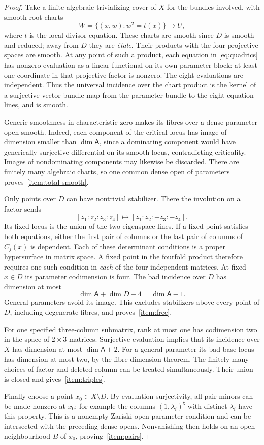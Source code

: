 \begin{proof}
Take a finite algebraic trivializing cover of $X$ for the bundles involved, with smooth root charts
\[
 W=\{(x,w):w^2=t(x)\}\longrightarrow U,
\]
where $t$ is the local divisor equation. These charts are smooth since $D$ is smooth and reduced; away from $D$ they are \emph{\'{e}tale}. Their products with the four projective spaces are smooth. At any point of such a product, each equation in \eqref{eq:quadrics} has nonzero evaluation as a linear functional on its own parameter block: at least one coordinate in that projective factor is nonzero. The eight evaluations are independent. Thus the universal incidence over the chart product is the kernel of a surjective vector-bundle map from the parameter bundle to the eight equation lines, and is smooth.

Generic smoothness in characteristic zero makes its fibres over a dense parameter open smooth. Indeed, each component of the critical locus has image of dimension smaller than $\dim\mathsf A$, since a dominating component would have generically surjective differential on its smooth locus, contradicting criticality. Images of nondominating components may likewise be discarded. There are finitely many algebraic charts, so one common dense open of parameters proves~\ref{item:total-smooth}.

Only points over $D$ can have nontrivial stabilizer. There the involution on a factor sends
\[
 [z_1:z_2:z_3:z_4]\longmapsto[z_1:z_2:-z_3:-z_4].
\]
Its fixed locus is the union of the two eigenspace lines. If a fixed point satisfies both equations, either the first pair of columns or the last pair of columns of $C_j(x)$ is dependent. Each of these determinant conditions is a proper hypersurface in matrix space. A fixed point in the fourfold product therefore requires one such condition in \emph{each} of the four independent matrices. At fixed $x\in D$ its parameter codimension is four. The bad incidence over $D$ has dimension at most
\begin{equation}\label{eq:fixed-dimension}
 \dim\mathsf A+\dim D-4=\dim\mathsf A-1.
\end{equation}
General parameters avoid its image. This excludes stabilizers above every point of $D$, including degenerate fibres, and proves~\ref{item:free}.

For one specified three-column submatrix, rank at most one has codimension two in the space of $2\times3$ matrices. Surjective evaluation implies that its incidence over $X$ has dimension at most $\dim\mathsf A+2$. For a general parameter its bad base locus has dimension at most two, by the fibre-dimension theorem. The finitely many choices of factor and deleted column can be treated simultaneously. Their union is closed and gives~\ref{item:triples}.

Finally choose a point $x_0\in X\setminus D$. By evaluation surjectivity, all pair minors can be made nonzero at $x_0$; for example the columns $(1,\lambda_i)^{\mathsf t}$ with distinct $\lambda_i$ have this property. This is a nonempty Zariski-open parameter condition and can be intersected with the preceding dense opens. Nonvanishing then holds on an open neighbourhood $B$ of $x_0$, proving~\ref{item:pairs}.
\end{proof}

